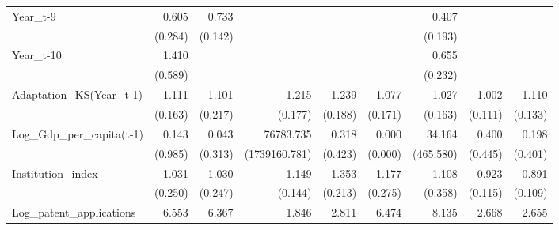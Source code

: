 \begin{table}[htbp]
\begin{tabular}{l*{8}{D{.}{.}{-1}}}
Year\_t-9            &       0.605         &       0.733\sym{\%}  &                     &                     &                     &       0.407\sym{*}  &                     &                     \\
                    &     (0.284)         &     (0.142)         &                     &                     &                     &     (0.193)         &                     &                     \\
Year\_t-10           &       1.410         &                     &                     &                     &                     &       0.655         &                     &                     \\
                    &     (0.589)         &                     &                     &                     &                     &     (0.232)         &                     &                     \\
Adaptation\_KS(Year\_t-1)&       1.111         &       1.101         &       1.215         &       1.239         &       1.077         &       1.027         &       1.002         &       1.110         \\
                    &     (0.163)         &     (0.217)         &     (0.177)         &     (0.188)         &     (0.171)         &     (0.163)         &     (0.111)         &     (0.133)         \\
Log\_Gdp\_per\_capita(t-1)&       0.143         &       0.043         &   76783.735         &       0.318         &       0.000\sym{**} &      34.164         &       0.400         &       0.198         \\
                    &     (0.985)         &     (0.313)         &(1739160.781)         &     (0.423)         &     (0.000)         &   (465.580)         &     (0.445)         &     (0.401)         \\
Institution\_index   &       1.031         &       1.030         &       1.149         &       1.353\sym{*}  &       1.177         &       1.108         &       0.923         &       0.891         \\
                    &     (0.250)         &     (0.247)         &     (0.144)         &     (0.213)         &     (0.275)         &     (0.358)         &     (0.115)         &     (0.109)         \\
Log\_patent\_applications&       6.553\sym{***}&       6.367\sym{***}&       1.846         &       2.811\sym{***}&       6.474\sym{***}&       8.135\sym{**} &       2.668\sym{***}&       2.655\sym{***}\\

\end{tabular}
\end{table}
